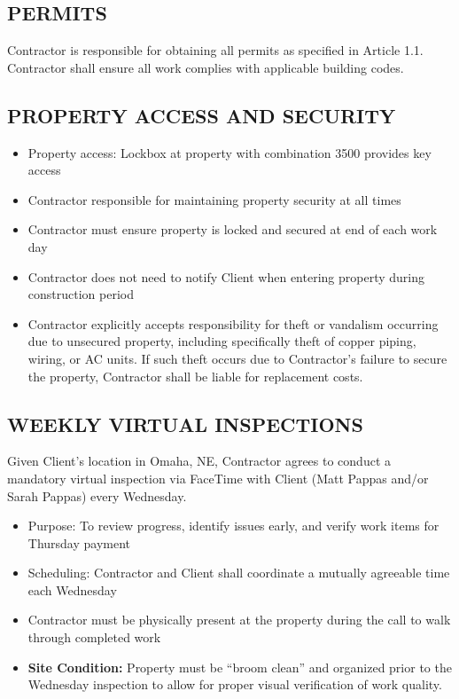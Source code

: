 \documentclass[10pt,letterpaper]{article}
\begin{document}
\subsection{PERMITS}
Contractor is responsible for obtaining all permits as specified in Article 1.1. Contractor shall ensure all work complies with applicable building codes.

\subsection{PROPERTY ACCESS AND SECURITY}
\begin{itemize}[leftmargin=*]
\item Property access: Lockbox at property with combination 3500 provides key access
\item Contractor responsible for maintaining property security at all times
\item Contractor must ensure property is locked and secured at end of each work day
\item Contractor does not need to notify Client when entering property during construction period
\item Contractor explicitly accepts responsibility for theft or vandalism occurring due to unsecured property, including specifically theft of copper piping, wiring, or AC units. If such theft occurs due to Contractor's failure to secure the property, Contractor shall be liable for replacement costs.
\end{itemize}

\subsection{WEEKLY VIRTUAL INSPECTIONS}
Given Client's location in Omaha, NE, Contractor agrees to conduct a mandatory virtual inspection via FaceTime with Client (Matt Pappas and/or Sarah Pappas) every Wednesday.
\begin{itemize}[leftmargin=*]
\item Purpose: To review progress, identify issues early, and verify work items for Thursday payment
\item Scheduling: Contractor and Client shall coordinate a mutually agreeable time each Wednesday
\item Contractor must be physically present at the property during the call to walk through completed work
\item \textbf{Site Condition:} Property must be ``broom clean'' and organized prior to the Wednesday inspection to allow for proper visual verification of work quality.
\end{itemize}
\end{document}
